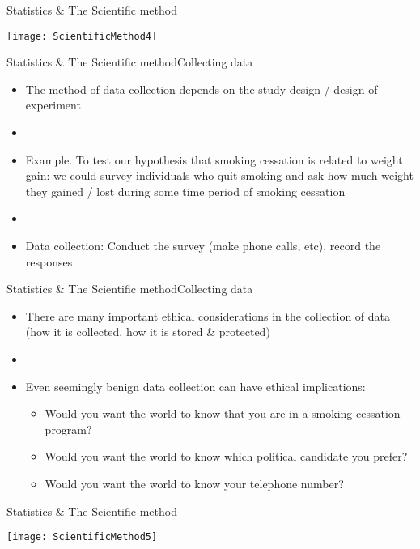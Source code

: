 \documentclass[xcolor=dvipsnames]{beamer}
\begin{document}
\begin{frame}{Statistics \& The Scientific method}
	\vspace{-12pt}
	\begin{center}
		\texttt{[image: ScientificMethod4]}
	\end{center}
\end{frame}

\begin{frame}{Statistics \& The Scientific method}{Collecting data}
	\begin{itemize}
		\item The method of data collection depends on the study design / design of experiment 
		\item[]
		\item Example. To test our hypothesis that smoking cessation is related to weight gain: we could survey individuals who quit smoking and ask how much weight they gained / lost during some time period of smoking cessation
		\item[]
		\item Data collection: Conduct the survey (make phone calls, etc), record the responses
	\end{itemize}
\end{frame}

\begin{frame}{Statistics \& The Scientific method}{Collecting data}
	\begin{itemize}
		\item There are many important ethical considerations in the collection of data (how it is collected, how it is stored \& protected)
		\item[]
		\item Even seemingly benign data collection can have ethical implications:
		\begin{itemize}
			\item Would you want the world to know that you are in a smoking cessation program?
			\item Would you want the world to know which political candidate you prefer?
			\item Would you want the world to know your telephone number?
		\end{itemize}
	\end{itemize}
\end{frame}

\begin{frame}{Statistics \& The Scientific method}
	\vspace{-12pt}
	\begin{center}
		\texttt{[image: ScientificMethod5]}
	\end{center}
\end{frame}
\end{document}
